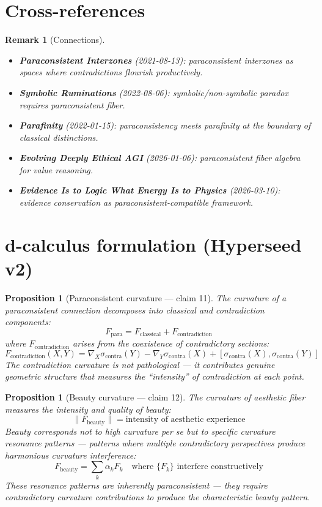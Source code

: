 \documentclass[11pt,a4paper]{article}
\newtheorem{proposition}[definition]{Proposition}
\newtheorem{remark}[definition]{Remark}
\begin{document}
\section{Cross-references}

\begin{remark}[Connections]
\begin{itemize}
\item \textbf{Paraconsistent Interzones} (2021-08-13): paraconsistent
  interzones as spaces where contradictions flourish productively.
\item \textbf{Symbolic Ruminations} (2022-08-06): symbolic/non-symbolic
  paradox requires paraconsistent fiber.
\item \textbf{Parafinity} (2022-01-15): paraconsistency meets parafinity
  at the boundary of classical distinctions.
\item \textbf{Evolving Deeply Ethical AGI} (2026-01-06): paraconsistent
  fiber algebra for value reasoning.
\item \textbf{Evidence Is to Logic What Energy Is to Physics} (2026-03-10):
  evidence conservation as paraconsistent-compatible framework.
\end{itemize}
\end{remark}

\section{d-calculus formulation (Hyperseed v2)}

\begin{proposition}[Paraconsistent curvature --- claim 11]
\label{prop:curvature}
The curvature of a paraconsistent connection decomposes into classical
and contradiction components:
\[
  F_{\text{para}} = F_{\text{classical}} + F_{\text{contradiction}}
\]
where $F_{\text{contradiction}}$ arises from the coexistence of
contradictory sections:
\[
  F_{\text{contradiction}}(X, Y) = \nabla_X \sigma_{\text{contra}}(Y) -
    \nabla_Y \sigma_{\text{contra}}(X) +
    [\sigma_{\text{contra}}(X), \sigma_{\text{contra}}(Y)]
\]
The contradiction curvature is not pathological --- it contributes
genuine geometric structure that measures the ``intensity'' of
contradiction at each point.
\end{proposition}

\begin{proposition}[Beauty curvature --- claim 12]
\label{prop:beauty}
The curvature of aesthetic fiber measures the intensity and quality of
beauty:
\[
  \|F_{\text{beauty}}\| = \text{intensity of aesthetic experience}
\]
Beauty corresponds not to high curvature per se but to specific
\emph{curvature resonance patterns} --- patterns where multiple
contradictory perspectives produce harmonious curvature interference:
\[
  F_{\text{beauty}} = \sum_k \alpha_k F_k \quad \text{where }
  \{F_k\} \text{ interfere constructively}
\]
These resonance patterns are inherently paraconsistent --- they require
contradictory curvature contributions to produce the characteristic
beauty pattern.
\end{proposition}
\end{document}
